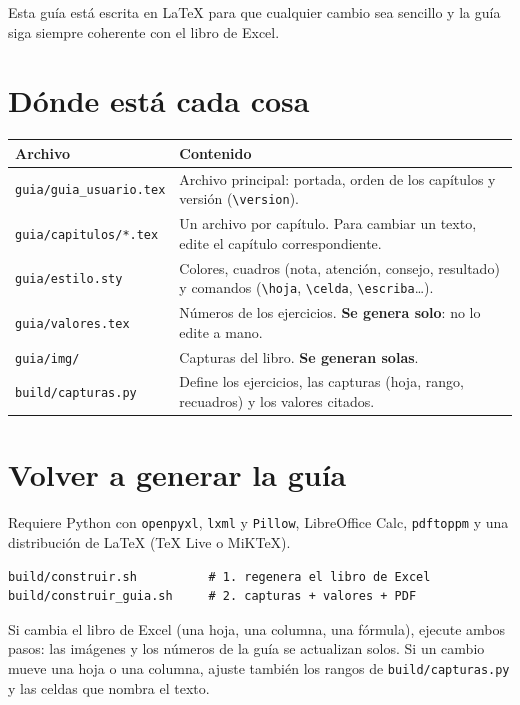 Esta guía está escrita en LaTeX para que cualquier cambio sea sencillo y la guía siga siempre coherente con el libro de Excel.

\section{Dónde está cada cosa}
\begin{center}
\begin{tabularx}{\linewidth}{@{}l X@{}}
\toprule
\textbf{Archivo} & \textbf{Contenido} \\ \midrule
\texttt{guia/guia\_usuario.tex} & Archivo principal: portada, orden de los capítulos y versión (\verb|\version|). \\
\texttt{guia/capitulos/*.tex} & Un archivo por capítulo. Para cambiar un texto, edite el capítulo correspondiente. \\
\texttt{guia/estilo.sty} & Colores, cuadros (nota, atención, consejo, resultado) y comandos (\verb|\hoja|, \verb|\celda|, \verb|\escriba|\dots). \\
\texttt{guia/valores.tex} & Números de los ejercicios. \textbf{Se genera solo}: no lo edite a mano. \\
\texttt{guia/img/} & Capturas del libro. \textbf{Se generan solas}. \\
\texttt{build/capturas.py} & Define los ejercicios, las capturas (hoja, rango, recuadros) y los valores citados. \\
\bottomrule
\end{tabularx}
\end{center}

\section{Volver a generar la guía}
Requiere Python con \texttt{openpyxl}, \texttt{lxml} y \texttt{Pillow}, LibreOffice Calc, \texttt{pdftoppm} y una distribución de LaTeX (TeX Live o MiKTeX).
\begin{verbatim}
build/construir.sh          # 1. regenera el libro de Excel
build/construir_guia.sh     # 2. capturas + valores + PDF
\end{verbatim}
Si cambia el libro de Excel (una hoja, una columna, una fórmula), ejecute ambos pasos: las imágenes y los números de la guía se actualizan solos.
Si un cambio mueve una hoja o una columna, ajuste también los rangos de \texttt{build/capturas.py} y las celdas que nombra el texto.

